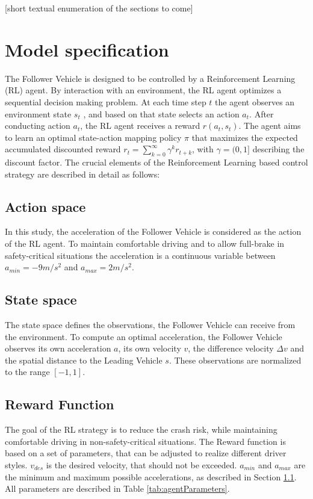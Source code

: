 \documentclass[review]{elsarticle}
\begin{document}
[short textual enumeration of the sections to come]

\section{Model specification}
The Follower Vehicle is designed to be controlled by a Reinforcement Learning (RL) agent. By interaction with an environment, the RL agent optimizes a sequential decision making problem. At each time step $t$ the agent observes an environment state $s_t$ , and based on that state selects an action $a_t$. After conducting action $a_t$, the RL agent receives a reward $r(a_t,s_t)$. The agent aims to learn an optimal state-action mapping policy $\pi$ that maximizes the expected accumulated discounted reward $r_{t}=\sum_{k=0}^{\infty} \gamma^{k} r_{t+k}$, with $\gamma = (0,1]$ describing the discount factor. The crucial elements
of the Reinforcement Learning based control strategy are described
in detail as follows:

\subsection{Action space}
\label{actionSpace}
In this study, the acceleration of the Follower Vehicle is considered as the action of the RL agent. To maintain  comfortable driving and to allow full-brake in safety-critical situations the acceleration is a continuous variable between $a_{min} = -9m/s^2$ and $a_{max} = 2m/s^2$.


\subsection{State space}
The state space defines the observations, the Follower Vehicle can receive from the environment. To compute an optimal acceleration, the Follower Vehicle observes its own acceleration $a$, its own velocity $v$, the difference velocity $\Delta v$ and the spatial distance to the Leading Vehicle $s$. These observations are normalized to the range $[-1,1]$.


\subsection{Reward Function}
\label{rewardFunction}
The goal of the RL strategy is to reduce the crash risk, while maintaining comfortable driving in non-safety-critical situations. The Reward function is based on a set of parameters, that can be adjusted to realize different driver styles. $v_{des}$ is the desired velocity, that should not be exceeded. $a_{min}$ and $a_{max}$ are the minimum and maximum possible accelerations, as described in Section \ref{actionSpace}. All parameters are described in Table \ref{tab:agentParameters}.
\end{document}
